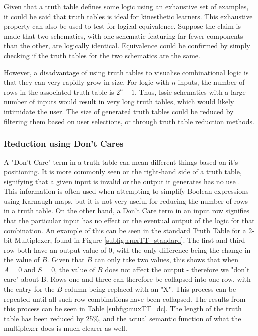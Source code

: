 Given that a truth table defines some logic using an exhaustive set of examples, it could be said that truth tables is ideal for kinesthetic learners. This exhaustive property can also be used to test for logical equivalence. Suppose the claim is made that two schematics, with one schematic featuring far fewer components than the other, are logically identical. Equivalence could be confirmed by simply checking if the truth tables for the two schematics are the same. 

However, a disadvantage of using truth tables to visualise combinational logic is that they can very rapidly grow in size. For logic with $n$ inputs, the number of rows in the associated truth table is $2^n -1$. Thus, Issie schematics with a large number of inputs would result in very long truth tables, which would likely intimidate the user. The size of generated truth tables could be reduced by filtering them based on user selections, or through truth table reduction methods.   

\subsubsection{Reduction using Don't Cares}
A "Don't Care" term in a truth table can mean different things based on it's positioning. It is more commonly seen on the right-hand side of a truth table, signifying that a given input is invalid or the output it generates has no use \cite{1969logic}. This information is often used when attempting to simplify Boolean expressions using Karnaugh maps, but it is not very useful for reducing the number of rows in a truth table. On the other hand, a Don't Care term in an input row signifies that the particular input has no effect on the eventual output of the logic for that combination. An example of this can be seen in the standard Truth Table for a 2-bit Multiplexer, found in Figure \ref{subfig:muxTT_standard}. The first and third row both have an output value of 0, with the only difference being the change in the value of $B$. Given that $B$ can only take two values, this shows that when $A=0$ and $S=0$, the value of $B$ does not affect the output - therefore we "don't care" about B. Rows one and three can therefore be collapsed into one row, with the entry for the $B$ column being replaced with an "X". This process can be repeated until all such row combinations have been collapsed. The results from this process can be seen in Table \ref{subfig:muxTT_dc}. The length of the truth table has been reduced by 25\%, and the actual semantic function of what the multiplexer does is much clearer as well.

